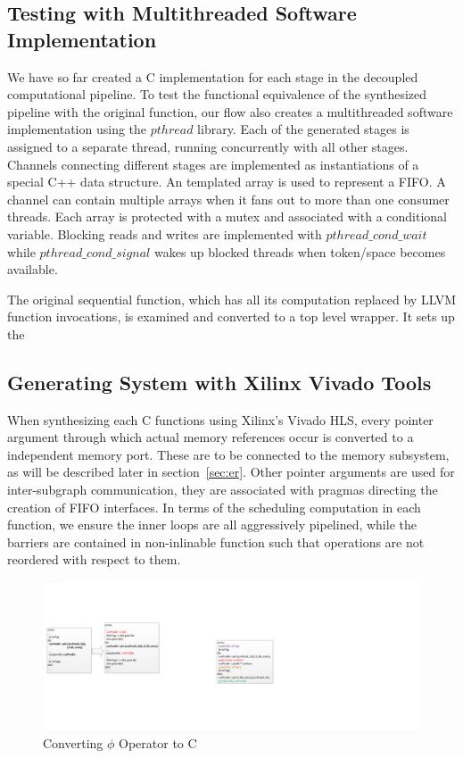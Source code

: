 \subsection{Testing with Multithreaded Software Implementation}
We have so far created a C implementation for each
stage in the decoupled computational pipeline. 
To test the functional equivalence of the synthesized pipeline with the original
function, our flow also creates a multithreaded software implementation using the
$pthread$ library. Each of
the generated stages is assigned to a separate thread, running concurrently with 
all other stages. Channels connecting different stages are implemented as instantiations of a special C++ data structure. An templated array is used to represent a FIFO. A channel can contain multiple arrays when it fans out to
more than one consumer threads. Each array is protected with a mutex and associated
with a conditional variable. Blocking reads and writes are implemented with $pthread\_cond\_wait$ while $pthread\_cond\_signal$ wakes up blocked threads when
token/space becomes available. 

The original sequential function, which has all its computation replaced by
LLVM function invocations, is examined and converted to a top level wrapper. 
It sets up the 


\subsection{Generating System with Xilinx Vivado Tools}
When synthesizing each C functions using Xilinx's Vivado HLS, every pointer argument through which actual memory references occur is converted to a independent memory port. These
are to be connected to the memory subsystem, as will be described later in section~\ref{sec:er}. Other pointer arguments are used for inter-subgraph communication,
they are associated with pragmas directing the creation of FIFO interfaces. In terms of
the scheduling computation in each function, we ensure the inner loops are
all aggressively pipelined, while the barriers are contained in non-inlinable function such that operations are not reordered with respect to them.

\begin{figure}[htp]
\begin{center}
\includegraphics[width=0.7\linewidth]{chap3fig/SSA2C.pdf}
\caption{Converting $\phi$ Operator to C
\label{fig:phi2c}}
\end{center}
\end{figure}


